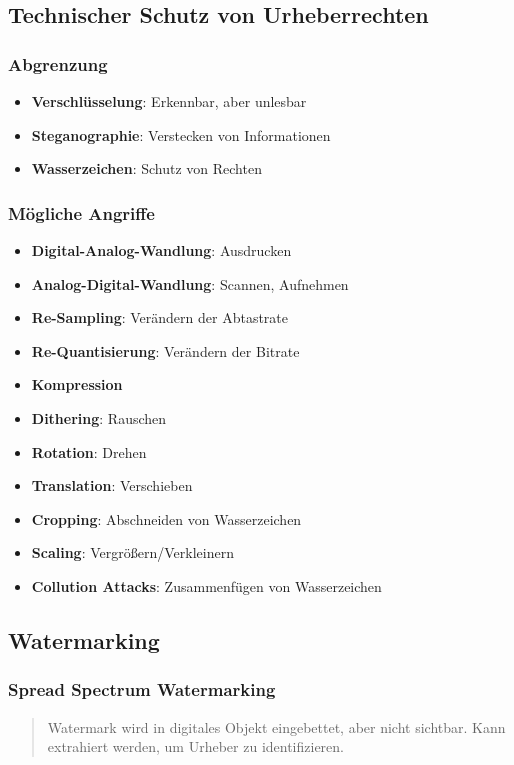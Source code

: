 \documentclass{article}
\begin{document}
\subsection{Technischer Schutz von Urheberrechten}
\subsubsection{Abgrenzung}
\begin{itemize}
  \item \textbf{Verschlüsselung}: Erkennbar, aber unlesbar
  \item \textbf{Steganographie}: Verstecken von Informationen
  \item \textbf{Wasserzeichen}: Schutz von Rechten
\end{itemize}

\subsubsection{Mögliche Angriffe}
\begin{itemize}
  \item \textbf{Digital-Analog-Wandlung}: Ausdrucken
  \item \textbf{Analog-Digital-Wandlung}: Scannen, Aufnehmen
  \item \textbf{Re-Sampling}: Verändern der Abtastrate
  \item \textbf{Re-Quantisierung}: Verändern der Bitrate
  \item \textbf{Kompression}
  \item \textbf{Dithering}: Rauschen
  \item \textbf{Rotation}: Drehen
  \item \textbf{Translation}: Verschieben
  \item \textbf{Cropping}: Abschneiden von Wasserzeichen
  \item \textbf{Scaling}: Vergrößern/Verkleinern
  \item \textbf{Collution Attacks}: Zusammenfügen von Wasserzeichen
\end{itemize}

\subsection{Watermarking}
\subsubsection{Spread Spectrum Watermarking}
\begin{quote}Watermark wird in digitales Objekt eingebettet, aber nicht sichtbar. Kann extrahiert werden, um Urheber zu identifizieren.\end{quote}
\end{document}
